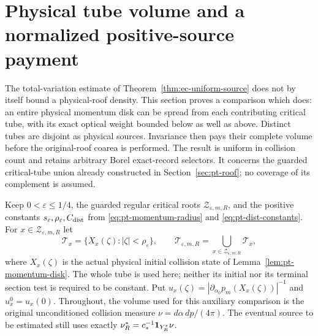 \section{Physical tube volume and a normalized positive-source payment}
\label{sec:cv-tube-volume}
The total-variation estimate of Theorem~\ref{thm:ec-uniform-source}
does not by itself bound a physical-roof density.  This section proves
a comparison which does: an entire physical momentum disk can be
spread from each contributing critical tube, with its exact optical
weight bounded below as well as above.  Distinct tubes are disjoint
as physical sources.  Invariance then pays their complete volume
before the original-roof coarea is performed.  The result is uniform
in collision count and retains arbitrary Borel exact-record selectors.
It concerns the guarded critical-tube union already constructed in
Section~\ref{sec:pt-roof}; no coverage of its complement is assumed.

Keep $0<\varepsilon\le1/4$, the guarded regular critical roots
$\mathscr Z_{\varepsilon,m,R}$, and the positive constants
$s_\varepsilon,\rho_\varepsilon,C_{\rm dist}$ from
\eqref{eq:pt-momentum-radius} and \eqref{eq:pt-dist-constants}.
For $x\in\mathscr Z_{\varepsilon,m,R}$ let
\[
 \mathcal T_x=\{X_x(\zeta):|\zeta|<\rho_\varepsilon\},\qquad
 \mathcal T_{\varepsilon,m,R}
       =\bigcup_{x\in\mathscr Z_{\varepsilon,m,R}}\mathcal T_x,
\]
where $X_x(\zeta)$ is the actual physical initial collision state
of Lemma~\ref{lem:pt-momentum-disk}.  The whole tube is used here;
neither its initial nor its terminal section test is required to be
constant.  Put $u_x(\zeta)=|\partial_{\alpha_0}p_m(X_x(\zeta))|^{-1}$
and $u_x^0=u_x(0)$.  Throughout, the volume used for this auxiliary
comparison is the original unconditioned collision measure
$\nu=d\alpha\,dp/(4\pi)$.  The eventual source to be estimated still
uses exactly $\nu_R^*=c_*^{-1}\mathbf1_{Y_R^*}\nu$.

